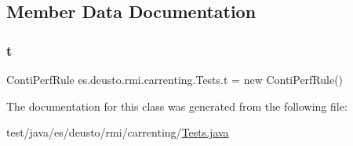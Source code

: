 \subsection{Member Data Documentation}
\mbox{\label{classes_1_1deusto_1_1rmi_1_1carrenting_1_1_tests_adf1163c82f75d1405b6b3b87926e465c}} 
\subsubsection{\texorpdfstring{t}{t}}
{\footnotesize\ttfamily Conti\+Perf\+Rule es.\+deusto.\+rmi.\+carrenting.\+Tests.\+t = new Conti\+Perf\+Rule()}



The documentation for this class was generated from the following file\+:\begin{DoxyCompactItemize}
\item 
test/java/es/deusto/rmi/carrenting/\mbox{\hyperlink{_tests_8java}{Tests.\+java}}\end{DoxyCompactItemize}
